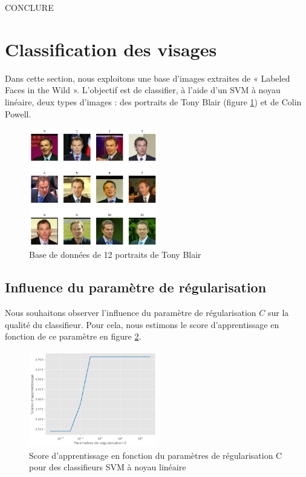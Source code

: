 \documentclass[a4paper,12pt]{article}
\begin{document}
CONCLURE \\

\newpage

\section{Classification des visages}

Dans cette section, nous exploitons une base d'images extraites de « Labeled Faces in the Wild ».
L'objectif est de classifier, à l'aide d'un SVM à noyau linéaire, deux types d'images : des portraits de Tony Blair (figure \ref{fig : visages}) et de Colin Powell. 


\begin{figure}[H]
    \centering
    \includegraphics[width=0.5\textwidth]{Images/visages.png}
    \caption{Base de données de 12 portraits de Tony Blair}
    \label{fig : visages}
\end{figure}

\subsection{Influence du paramètre de régularisation}

Nous souhaitons observer l'influence du paramètre de régularisation $C$ sur la qualité du classifieur. 
Pour cela, nous estimons le score d'apprentissage en fonction de ce paramètre en figure \ref{fig : C}.

\begin{figure}[H]
        \centering
        \includegraphics[width=0.5\textwidth]{Images/erreur_prediction.png}
        \caption{Score d'apprentissage en fonction du paramètres de régularisation C pour des classifieurs SVM à noyau linéaire}
        \label{fig : C}
\end{figure}
\end{document}
